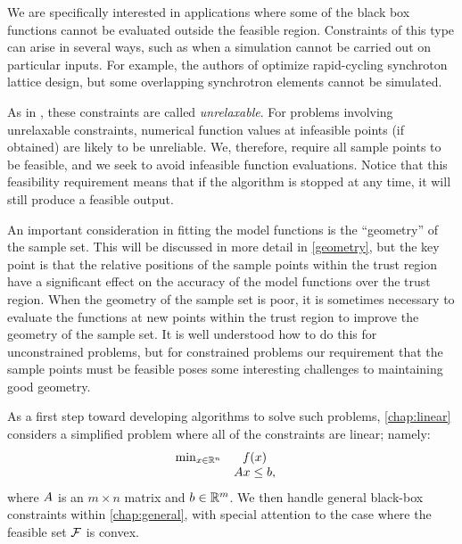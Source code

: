 %
We are specifically interested in applications where some of the black box functions cannot be evaluated outside the feasible region.
Constraints of this type can arise in several ways, such as when a simulation cannot be carried out on particular inputs.
For example, the authors of \cite{Padidar2021} optimize rapid-cycling synchroton lattice design,
but some overlapping synchrotron elements cannot be simulated.

As in \cite{digabel2015taxonomy}, these constraints are called {\em unrelaxable}.
For problems involving unrelaxable constraints,  numerical function values at infeasible points (if obtained) are likely to be unreliable.
We, therefore, require all sample points to be feasible, and we seek to avoid infeasible function evaluations.
Notice that this feasibility requirement means that if the algorithm is stopped at any time, it will still produce a feasible output.


An important consideration in fitting the model functions is the ``geometry'' of the sample set.
This will be discussed in more detail in \cref{geometry}, but the key point is that the relative positions of the sample points within the trust region have a significant effect on the accuracy of the model functions over the trust region.
When the geometry of the sample set is poor, it is sometimes necessary to evaluate the functions at new points within the trust region to improve the geometry of the sample set.
It is well understood how to do this for unconstrained problems, but for constrained problems
our requirement that the sample points must be feasible poses some interesting challenges to maintaining good geometry.   

As a first step toward developing algorithms to solve such problems, \cref{chap:linear}  considers a simplified problem where all of the constraints are linear; namely:
\begin{align*}
\begin{array}{ccl} \min_{x \in \mathbb R^n} & f(x) \\
& {A} x \le {b}, & 
\end{array}
\end{align*}
where ${A}$ is an $m \times n$ matrix and ${b} \in \mathbb R^m$.
We then handle general black-box constraints within \cref{chap:general}, 
with special attention to the case where the feasible set ${\mathcal F}$ is convex.

